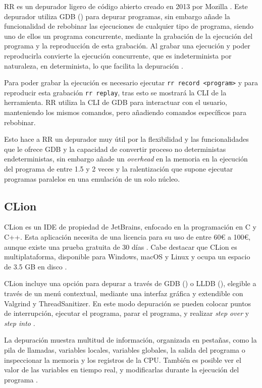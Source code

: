 RR es un \gls{depurador} ligero de código abierto creado en 2013 por Mozilla \cite{RRWiki}. Este depurador utiliza GDB () para \gls{depurar} programas, sin embargo añade la funcionalidad de rebobinar las ejecuciones de cualquier tipo de programa, siendo uno de ellos un \gls{programa concurrente}, mediante la grabación de la ejecución del programa y la reproducción de esta grabación. Al grabar una ejecución y poder reproducirla convierte la ejecución concurrente, que es \gls{indeterminista} por naturaleza, en \gls{determinista}, lo que facilita la depuración \cite{RR}.

Para poder grabar la ejecución es necesario ejecutar \texttt{rr record <program>} y para reproducir esta grabación \texttt{rr replay}, tras esto se mostrará la \gls{CLI} de la herramienta. RR utiliza la \gls{CLI} de GDB para interactuar con el usuario, manteniendo los mismos comandos, pero añadiendo comandos específicos para rebobinar.

Esto hace a RR un \gls{depurador} muy útil por la flexibilidad y las funcionalidades que le ofrece GDB y la capacidad de convertir \gls{proceso} no deterministas en\glspl{determinista}, sin embargo añade un \textit{\gls{overhead}} en la memoria en la ejecución del programa de entre 1.5 y 2 veces y la ralentización que supone ejecutar programas paralelos en una emulación de un solo núcleo\cite{RR}.

\subsection{CLion}{\label{subsec:clion}}
CLion es un \gls{IDE} de propiedad de JetBrains, enfocado en la programación en C y C++. Esta aplicación necesita de una licencia para su uso de entre 60€ a 100€, aunque existe una prueba gratuita de 30 días \cite{ClionPrizing}. Cabe destacar que CLion es multiplataforma, disponible para Windows, macOS y Linux y ocupa un espacio de 3.5 GB en disco \cite{ClionDownload}.

CLion incluye una opción para depurar a través de GDB () o LLDB (), elegible a través de un menú contextual, mediante una \gls{interfaz gráfica} y extendible con Valgrind y ThreadSanitizer. En este modo depuración se pueden colocar puntos de interrupción, ejecutar el programa, parar el programa, y realizar \textit{\gls{step over}} y \textit{\gls{step into}} \cite{ClionDebugger}.

La depuración muestra multitud de información, organizada en pestañas, como la pila de llamadas, variables locales, variables globales, la salida del programa o inspeccionar la memoria y los \gls{registros} de la \gls{CPU}. También es posible ver el valor de las variables en tiempo real, y modificarlas durante la ejecución del programa \cite{ClionDebuggerToolWindow}.


